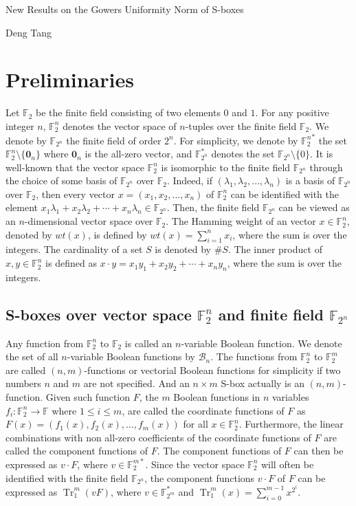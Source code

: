 \documentclass[12 pt]{article}
\def\F{{\mathbb F}}
\newcommand{\Tr}{\operatorname{Tr}}
\begin{document}


\begin{center}
\Large{New Results on the  Gowers Uniformity Norm of S-boxes}
\end{center}

\begin{center}
Deng Tang
\end{center}

\section{Preliminaries}
  Let $ \F_2 $ be the finite field consisting of two elements $ 0 $ and $ 1 $. 
  For any positive integer $n$, $\F_2^n$ denotes the vector space of $ n $-tuples over the finite field $\F_2$.  
  We denote by $\F_{2^n}$ the finite field of order $2^n$. 
  For simplicity, we denote by ${\F_2^n}^\ast$ the set $\F_2^{n}\setminus\{\bm{0}_n\}$ where $\bm{0}_n$ is the all-zero vector, and $\F_{2^n}^*$ denotes the set $\F_{2^n}\setminus\{0\}$. 
  It is well-known that the vector space $\F_2^n$ is isomorphic to the finite field $\F_{2^n}$ through the choice of some basis of $\F_{2^n}$ over $\F_2$. 
  Indeed, if $(\lambda_1, \lambda_2, \ldots, \lambda_n)$ is a basis of $\F_{2^n}$ over $\F_2$, then every vector $x = (x_1,x_2,\ldots,x_n)$ of $\F_2^n$ can be identified with the element $x_1\lambda_1+x_2\lambda_2+\cdots+x_n\lambda_n\in\F_{2^n}$. 
  Then, the finite field $\F_{2^n}$ can be viewed as an $n$-dimensional vector space over $\F_2$. 
  The Hamming weight of an vector $x\in\mathbb F_2^n$, denoted by $wt(x)$, is defined by $wt(x)=\sum_{i=1}^nx_i$, where the sum is over the integers. 
  The cardinality of a set $S$ is denoted by $\#S$. 
  The inner product of $x, y \in \mathbb F_2^n$ is defined as $x\cdot y=x_1y_1+x_2y_2+\cdots+x_ny_n$, where the sum is over the integers.

\subsection{S-boxes over vector space $\F_2^n$ and finite field $\F_{2^n}$}
  Any function from $\F_2^n$ to $\F_2$ is called an $ n $-variable Boolean function. 
  We denote the set of all $n$-variable Boolean functions by $\mathcal{B}_n$. 
  The functions from $ \F_2^n $ to $ \F_2^m $ are called $ (n,m) $-functions or vectorial Boolean functions for simplicity if two numbers $ n $ and $ m $ are not specified. 
  And an $ n\times m $ S-box actually is an $ (n,m) $-function. 
  Given such function $ F $, the $ m $ Boolean functions in $ n $ variables $ f_i:\F_2^n\rightarrow\F $ where $ 1\le i\le m $, are called the coordinate functions of $ F $ as $ F(x)=\left( f_1(x),f_2(x),\dots,f_m(x) \right) $ for all $ x\in\F_2^n $.  
  Furthermore, the linear combinations with non all-zero coefficients of the coordinate functions of $F$ are called the component
  functions of $F$. 
  The component functions of $F$ can then be expressed as $v\cdot F$, where $v\in\F_2^{m*}$. 
  Since the vector space $ \F_2^n $ will often be identified with the finite field $ \F_{2^n} $, the component functions $v\cdot F$ of $F$ can be expressed as $\Tr_1^m(vF)$, where $v\in\F_{2^m}^*$ and $\Tr_1^m(x)=\sum_{i=0}^{m-1} x^{2^i}$.
\end{document}
